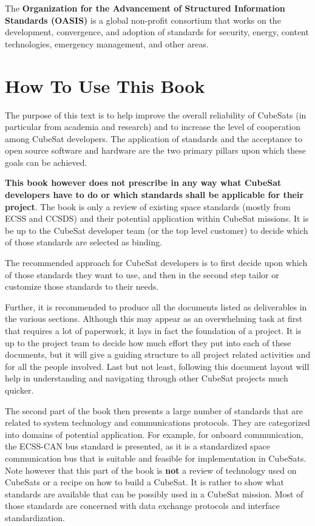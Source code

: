 The \textbf{Organization for the Advancement of Structured Information Standards (OASIS)} \cite{oasis.org} is a global non-profit consortium that works on the development, convergence, and adoption of standards for security, energy, content technologies, emergency management, and other areas.

\section{How To Use This Book}

The purpose of this text is to help improve the overall reliability of CubeSats (in particular from academia and research) and to increase the level of cooperation among CubeSat developers. The application of standards and the acceptance to open source software and hardware are the two primary pillars upon which these goals can be achieved.

\textbf{This book however does not prescribe in any way what CubeSat developers have to do or which standards shall be applicable for their project}. The book is only a review of existing space standards (mostly from ECSS and CCSDS) and their potential application within CubeSat missions. It is be up to the CubeSat developer team (or the top level customer) to decide which of those standards are selected as binding.

The recommended approach for CubeSat developers is to first decide upon which of those standards they want to use, and then in the second step tailor or customize those standards to their needs. 

Further, it is recommended to produce all the documents listed as deliverables in the various sections. Although this may appear as an overwhelming task at first that requires a lot of paperwork, it lays in fact the foundation of a project. It is up to the project team to decide how much effort they put into each of these documents, but it will give a guiding structure to all project related activities and for all the people involved. Last but not least, following this document layout will help in understanding and navigating through other CubeSat projects much quicker.

The second part of the book then presents a large number of standards that are related to system technology and communications protocols. They are categorized into domains of potential application. For example, for onboard communication, the ECSS-CAN bus standard is presented, as it is a standardized space communication bus that is suitable and feasible for implementation in CubeSats. Note however that this part of the book is \textbf{not} a review of technology used on CubeSats or a recipe on how to build a CubeSat. It is rather to show what standards are available that can be possibly used in a CubeSat mission. Most of those standards are concerned with data exchange protocols and interface standardization.